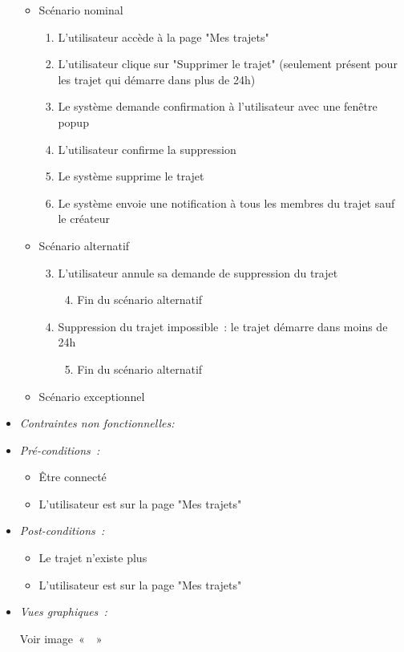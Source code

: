 \begin{itemize}
\begin{itemize}
    \item Scénario nominal
    \begin{enumerate}
        \item L'utilisateur accède à la page "Mes trajets"
        \item L'utilisateur clique sur "Supprimer le trajet" (seulement présent pour les trajet qui démarre dans plus de 24h)
        \item Le système demande confirmation à l'utilisateur avec une fenêtre popup
        \item L'utilisateur confirme la suppression
        \item Le système supprime le trajet
        \item Le système envoie une notification à tous les membres du trajet sauf le créateur
    \end{enumerate}
    \item Scénario alternatif
    \begin{enumerate}[{1{a}.}]\setcounter{enumi}{2}
            \item L'utilisateur annule sa demande de suppression du trajet
            \begin{enumerate}[{1.}]\setcounter{enumii}{3}
                \item Fin du scénario alternatif
            \end{enumerate}\item Suppression du trajet impossible~: le trajet démarre dans moins de 24h
            \begin{enumerate}[{1.}]\setcounter{enumii}{4}
                \item Fin du scénario alternatif
            \end{enumerate}
        \end{enumerate}
    \item Scénario exceptionnel
\end{itemize}

\item \textit{Contraintes non fonctionnelles:}

\item \textit{Pré-conditions~:}
\begin{itemize}
        \item Être connecté
        \item L'utilisateur est sur la page "Mes trajets"
    \end{itemize}

\item \textit{Post-conditions~:}
\begin{itemize}
        \item Le trajet n'existe plus
        \item L'utilisateur est sur la page "Mes trajets"
    \end{itemize}
    
    \item \textit{Vues graphiques~:}
    
    Voir image~«~~»

\end{itemize}
